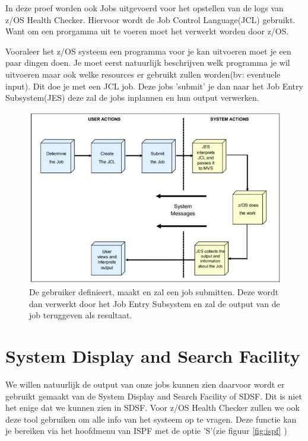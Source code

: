In deze proef worden ook Jobs uitgevoerd voor het opstellen van de logs van z/OS Health Checker. Hiervoor wordt de Job Control Language(JCL) gebruikt. Want om een prorgamma uit te voeren moet het verwerkt worden door z/OS.

Vooraleer het z/OS systeem een programma voor je kan uitvoeren moet je een paar dingen doen. Je moet eerst natuurlijk beschrijven welk programma je wil uitvoeren maar ook welke resources er gebruikt zullen worden(bv: eventuele input). Dit doe je met een JCL job. Deze jobs 'submit' je dan naar het Job Entry Subsystem(JES) deze zal de jobs inplannen en hun output verwerken. \cite{Cosimo2018}

\begin{figure}[h]
	\centering
	\includegraphics{img/JES}
	\caption[Visualisatie van JCL en JES]{De gebruiker definieert, maakt en zal een job submitten. Deze wordt dan verwerkt door het Job Entry Subsystem en zal de output van de job teruggeven als resultaat.}
	\label{fig:jes}
\end{figure}

\section{System Display and Search Facility}
\label{sec:System Display and Search Facility}

We willen natuurlijk de output van onze jobs kunnen zien daarvoor wordt er gebruikt gemaakt van de System Display and Search Facility of SDSF. Dit is niet het enige dat we kunnen zien in SDSF. Voor z/OS Health Checker zullen we ook deze tool gebruiken om alle info van het systeem op te vragen. Deze functie kan je bereiken via het hoofdmenu van ISPF met de optie 'S'(zie figuur \ref{fig:ispf} )

